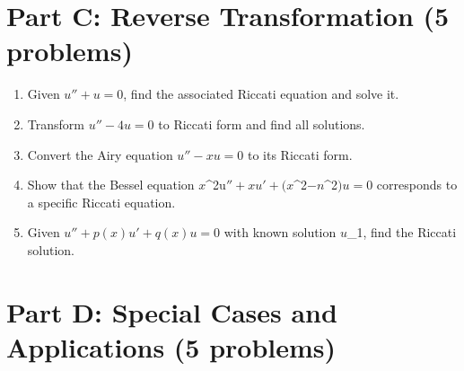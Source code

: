 \documentclass[12pt]{article}
\begin{document}

\section*{Part C: Reverse Transformation (5 problems)}

\begin{enumerate}[resume]
    \item Given $u'' + u = 0$, find the associated Riccati equation and solve it.

    \item Transform $u'' - 4u = 0$ to Riccati form and find all solutions.

    \item Convert the Airy equation $u'' - xu = 0$ to its Riccati form.

    \item Show that the Bessel equation $x$^{2u}$'' + xu' + (x$^{2}$ - n$^{2}$)u = 0$ corresponds to a specific Riccati equation.

    \item Given $u'' + p(x)u' + q(x)u = 0$ with known solution $u$_{1}$$, find the Riccati solution.
\end{enumerate}

\section*{Part D: Special Cases and Applications (5 problems)}
\end{document}
